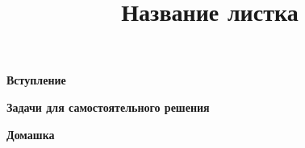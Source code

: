 \title{Название листка}
\maketitle

\textbf{\Large Вступление}

\zd
\zd
\vspace*{.5\baselineskip}

\textbf{\Large Задачи для самостоятельного решения}
\setcounter{zadacha}{0}

\zd
\zd
\zd
\zd
\zd
\zd
\zd
\zd
\zd

\vspace*{.5\baselineskip}

\textbf{\Large Домашка}
\setcounter{zadacha}{0}

\zd
\zd

\setcounter{zadacha}{0}
\pagebreak